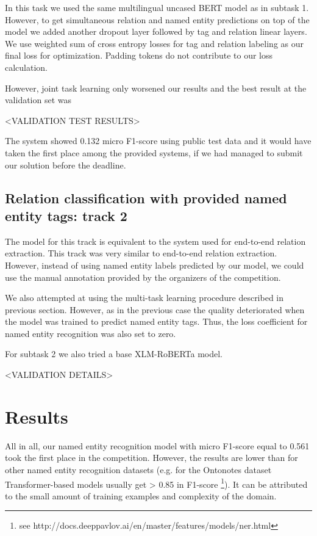 \documentclass{dialogue}
\begin{document}
In this task we used the same multilingual uncased BERT model as in subtask 1. However, to get simultaneous relation and named entity predictions on top of the model we added another dropout layer followed by tag and relation linear layers. We use weighted sum of cross entropy losses for tag and relation labeling as our final loss for optimization. Padding tokens do not contribute to our loss calculation.

However, joint task learning only worsened our results and the best result at the validation set was

<VALIDATION TEST RESULTS>

The system showed 0.132 micro F1-score using public test data and it would have taken the first place among the provided systems, if we had managed to submit our solution before the deadline.
\subsection{Relation classification with provided named entity tags: track 2}
The model for this track is equivalent to the system used for end-to-end relation extraction. This track was very similar to end-to-end relation extraction. However, instead of using named entity labels predicted by our model, we could use the manual annotation provided by the organizers of the competition.

We also attempted at using the multi-task learning procedure described in previous section. However, as in the previous case the quality deteriorated when the model was trained to predict named entity tags. Thus, the loss coefficient for named entity recognition was also set to zero.

For subtask 2 we also tried a base XLM-RoBERTa model. 

<VALIDATION DETAILS>

\section{Results}
All in all, our named entity recognition model with micro F1-score equal to 0.561 took the first place in the competition. However, the results are lower than for other named entity recognition datasets (e.g. for the Ontonotes dataset Transformer-based models usually get > 0.85 in F1-score \footnote{see http://docs.deeppavlov.ai/en/master/features/models/ner.html}). It can be attributed to the small amount of training examples and complexity of the domain.
\end{document}

